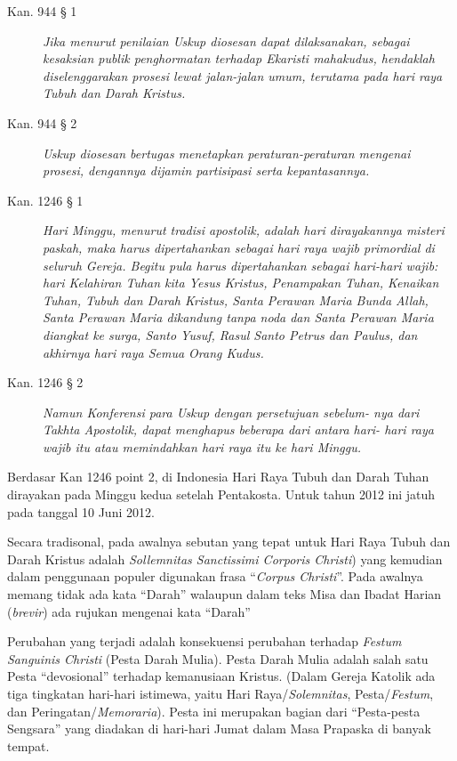\begin{description}
\item[Kan. 944 § 1] 	\textit{Jika menurut penilaian Uskup diosesan dapat dilaksanakan, sebagai kesaksian publik penghormatan terhadap Ekaristi mahakudus, hendaklah diselenggarakan prosesi lewat jalan-jalan umum, terutama pada hari raya Tubuh dan Darah Kristus.}
\item[Kan. 944 § 2] 	\textit{Uskup diosesan bertugas menetapkan peraturan-peraturan mengenai prosesi, dengannya dijamin partisipasi serta kepantasannya.}
\item[Kan. 1246 § 1] 	\textit{Hari Minggu, menurut tradisi apostolik, adalah hari dirayakannya misteri paskah, maka harus dipertahankan sebagai hari raya wajib primordial di seluruh Gereja. Begitu pula harus dipertahankan sebagai hari-hari wajib: hari Kelahiran Tuhan kita Yesus Kristus, Penampakan Tuhan, Kenaikan Tuhan, Tubuh dan Darah Kristus, Santa Perawan Maria Bunda Allah, Santa Perawan Maria dikandung tanpa noda dan Santa Perawan Maria diangkat ke surga, Santo Yusuf, Rasul Santo Petrus dan Paulus, dan akhirnya hari raya Semua Orang Kudus.}
\item[Kan. 1246 § 2] 	\textit{Namun Konferensi para Uskup dengan persetujuan sebelum- nya dari Takhta Apostolik, dapat menghapus beberapa dari antara hari- hari raya wajib itu atau memindahkan hari raya itu ke hari Minggu.}
\end{description}

Berdasar Kan 1246 point 2, di Indonesia Hari Raya Tubuh dan Darah Tuhan dirayakan pada Minggu kedua setelah Pentakosta. Untuk tahun 2012 ini jatuh pada tanggal 10 Juni 2012.




Secara tradisonal, pada awalnya sebutan yang tepat untuk Hari Raya Tubuh dan Darah Kristus adalah \textit{Sollemnitas Sanctissimi Corporis Christi}) yang kemudian dalam penggunaan populer digunakan frasa “\textit{Corpus Christi}”. Pada awalnya memang tidak ada kata “Darah” walaupun dalam teks Misa dan Ibadat Harian (\textit{brevir}) ada rujukan mengenai kata “Darah”



Perubahan yang terjadi adalah konsekuensi perubahan terhadap \textit{Festum Sanguinis Christi} (Pesta Darah Mulia). Pesta Darah Mulia adalah salah satu Pesta “devosional” terhadap kemanusiaan Kristus. (Dalam Gereja Katolik ada tiga tingkatan hari-hari istimewa, yaitu Hari Raya/\textit{Solemnitas}, Pesta/\textit{Festum}, dan Peringatan/\textit{Memoraria}). Pesta ini merupakan bagian dari “Pesta-pesta Sengsara” yang diadakan di hari-hari Jumat dalam Masa Prapaska di banyak tempat. 


